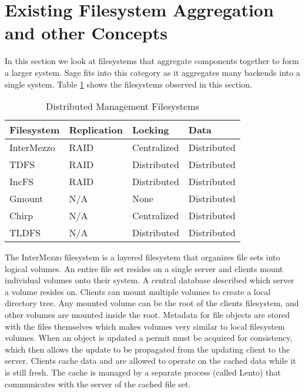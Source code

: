\section{Existing Filesystem Aggregation and other Concepts}

In this section we look at filesystems that aggregate components together to form a larger system. Sage fits into this category as it aggregates many backends into a single system. Table \ref{tab:aggregate} shows the filesystems observed in this section.

\begin{table}
\centering
\begin{tabular}[h]{l|l|l|l}

\textbf{Filesystem} & \textbf{Replication} & \textbf{Locking} & \textbf{Data} \\
\hline
InterMezzo & RAID & Centralized & Distributed \\
TDFS & RAID & Distributed & Distributed \\
IncFS & RAID & Distributed & Distributed \\
Gmount & N/A & None & Distributed \\
Chirp & N/A & Centralized & Distributed \\
TLDFS & N/A & Distributed & Distributed \\

\end{tabular}
\caption{Distributed Management Filesystems}
\label{tab:aggregate}
\end{table}



The InterMezzo \cite{Braam1999} filesystem is a layered filesystem that
organizes file sets into logical volumes. An entire file set resides on a
single server and clients mount individual volumes onto their system. A
central database described which server a volume resides on. Clients can mount
multiple volumes to create a local directory tree. Any mounted volume can be
the root of the clients filesystem, and other volumes are mounted inside the
root. Metadata for file objects are stored with the files themselves which
makes volumes very similar to local filesystem volumes. When an object is
updated a permit must be acquired for consistency, which then allows the
update to be propagated from the updating client to the server. Clients cache
data and are allowed to operate on the cached data while it is still fresh.
The cache is managed by a separate process (called Lento) that communicates
with the server of the cached file set.


